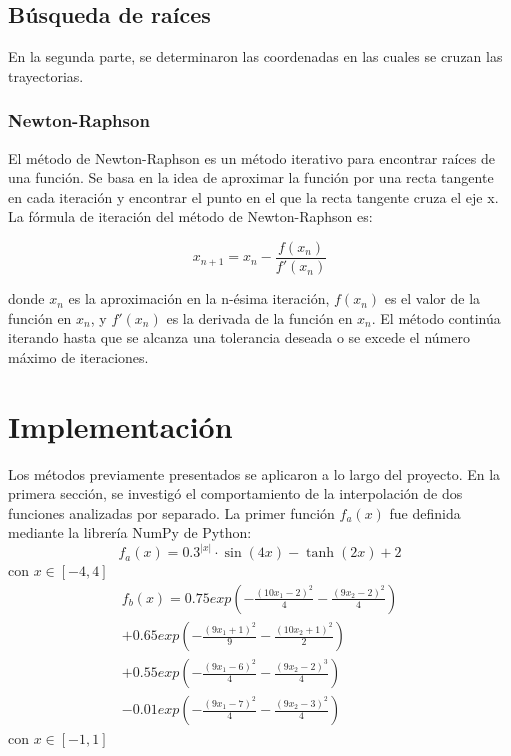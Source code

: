 \documentclass[12pt,a4]{article} %
\begin{document}
\begin{multicols}{2}
\subsection{Búsqueda de raíces}
En la segunda parte, se determinaron las coordenadas en las cuales se cruzan las trayectorias.
\subsubsection{Newton-Raphson}
El método de Newton-Raphson es un método iterativo para encontrar raíces de una función. Se basa en la idea de aproximar la función por una recta tangente en cada iteración y encontrar el punto en el que la recta tangente cruza el eje x. La fórmula de iteración del método de Newton-Raphson es:

\begin{equation}
    x_{n+1} = x_n - \frac{f(x_n)}{f'(x_n)}
\end{equation}

donde $x_n$ es la aproximación en la n-ésima iteración, $f(x_n)$ es el valor de la función en $x_n$, y $f'(x_n)$ es la derivada de la función en $x_n$. El método continúa iterando hasta que se alcanza una tolerancia deseada o se excede el número máximo de iteraciones.


\section{Implementación}

Los métodos previamente presentados se aplicaron a lo largo del proyecto. En la primera sección, se investigó el comportamiento de la interpolación de dos funciones analizadas por separado.
La primer función $f_a(x)$ fue definida mediante la librería NumPy de Python:
\begin{equation}
    f_a (x) = 0.3 ^{|x|}  \cdot \sin(4x) - \tanh(2x) + 2
    \label{$f_a(x)$}
\end{equation}
con $x \in [-4,4]$
\begin{multline*}  
    f_b(x) = 0.75exp\left(-\frac{(10x_1-2)^2}{4}-\frac{(9x_2-2)^2}{4}\right)\\
    +0.65exp\left(-\frac{(9x_1+1)^2}{9}-\frac{(10x_2+1)^2}{2}\right)\\
    +0.55exp\left(-\frac{(9x_1-6)^2}{4}-\frac{(9x_2-2)^3}{4}\right)\\
    -0.01exp\left(-\frac{(9x_1-7)^2}{4}-\frac{(9x_2-3)^2}{4}\right)
\end{multline*}
con $x\in[-1,1]$


\end{multicols}
\end{document}
